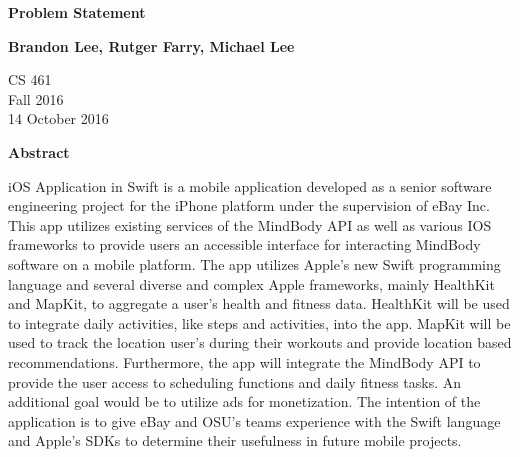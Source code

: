 \documentclass[letterpaper,10pt,titlepage]{article}
\begin{document}
\begin{titlepage}
    \begin{center}
        \vspace*{3.5cm}

        \textbf{Problem Statement}

        \vspace{0.5cm}

        \textbf{Brandon Lee, Rutger Farry, Michael Lee}

        \vspace{0.8cm}

        CS 461\\
        Fall 2016\\
        14 October 2016\\

        \vspace{1cm}

        \textbf{Abstract}\\

        \vspace{0.5cm}

        iOS Application in Swift is a mobile application developed as a senior software engineering project for the iPhone platform under the supervision of eBay Inc. This app utilizes existing services of the MindBody API as well as various IOS frameworks to provide users an accessible interface for interacting MindBody software on a mobile platform. The app utilizes Apple's new Swift programming language and several diverse and complex Apple frameworks, mainly HealthKit and MapKit, to aggregate a user's health and fitness data. HealthKit will be used to integrate daily activities, like steps and activities, into the app. MapKit will be used to track the location user's during their workouts and provide location based recommendations. Furthermore, the app will integrate the MindBody API to provide the user access to scheduling functions and daily fitness tasks. An additional goal would be to utilize ads for monetization. The intention of the application is to give eBay and OSU's teams experience with the Swift language and Apple's SDKs to determine their usefulness in future mobile projects.

        \vfill

    \end{center}
\end{titlepage}

\newpage

\tableofcontents
\end{document}
